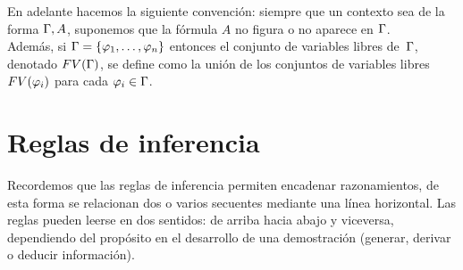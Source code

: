 \documentclass[11pt,letterpaper]{article}
\begin{document}


En adelante hacemos la siguiente convención: siempre que un contexto sea de la 
forma $\Gamma,A$, suponemos que la fórmula $A$ no figura o no aparece en $\Gamma$.\\
Adem\'as, si $\Gamma=\{\varphi_1,\ldots,\varphi_n\}$ entonces el conjunto de variables 
libres de~$\Gamma$, denotado $FV(\Gamma)$, se define como la unión de los conjuntos de
variables libres $FV(\varphi_i)$ para cada $\varphi_i \in \Gamma$.

\section{Reglas de inferencia}
Recordemos que las reglas de inferencia permiten encadenar razonamientos, de 
esta forma se relacionan dos o varios secuentes mediante una l\'inea 
horizontal. Las reglas pueden leerse en dos sentidos: de arriba hacia abajo y 
viceversa, dependiendo del prop\'osito en el desarrollo de una demostraci\'on 
(generar, derivar o deducir informaci\'on). 

\medskip
\end{document}
